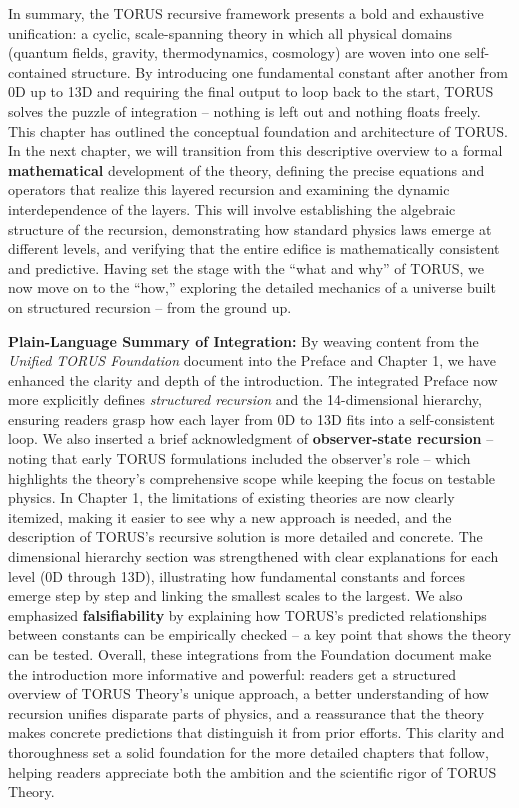 \documentclass[]{article}
\begin{document}
In summary, the TORUS recursive framework presents a bold and exhaustive
unification: a cyclic, scale-spanning theory in which all physical
domains (quantum fields, gravity, thermodynamics, cosmology) are woven
into one self-contained structure. By introducing one fundamental
constant after another from 0D up to 13D and requiring the final output
to loop back to the start, TORUS solves the puzzle of integration --
nothing is left out and nothing floats freely. This chapter has outlined
the conceptual foundation and architecture of TORUS. In the next
chapter, we will transition from this descriptive overview to a formal
\textbf{mathematical} development of the theory, defining the precise
equations and operators that realize this layered recursion and
examining the dynamic interdependence of the layers. This will involve
establishing the algebraic structure of the recursion, demonstrating how
standard physics laws emerge at different levels, and verifying that the
entire edifice is mathematically consistent and predictive. Having set
the stage with the ``what and why'' of TORUS, we now move on to the
``how,'' exploring the detailed mechanics of a universe built on
structured recursion -- from the ground up.

\textbf{Plain-Language Summary of Integration:} By weaving content from
the \emph{Unified TORUS Foundation} document into the Preface and
Chapter 1, we have enhanced the clarity and depth of the introduction.
The integrated Preface now more explicitly defines \emph{structured
recursion} and the 14-dimensional hierarchy, ensuring readers grasp how
each layer from 0D to 13D fits into a self-consistent loop. We also
inserted a brief acknowledgment of \textbf{observer-state recursion} --
noting that early TORUS formulations included the observer's role --
which highlights the theory's comprehensive scope while keeping the
focus on testable physics. In Chapter 1, the limitations of existing
theories are now clearly itemized, making it easier to see why a new
approach is needed, and the description of TORUS's recursive solution is
more detailed and concrete. The dimensional hierarchy section was
strengthened with clear explanations for each level (0D through 13D),
illustrating how fundamental constants and forces emerge step by step
and linking the smallest scales to the largest. We also emphasized
\textbf{falsifiability} by explaining how TORUS's predicted
relationships between constants can be empirically checked -- a key
point that shows the theory can be tested. Overall, these integrations
from the Foundation document make the introduction more informative and
powerful: readers get a structured overview of TORUS Theory's unique
approach, a better understanding of how recursion unifies disparate
parts of physics, and a reassurance that the theory makes concrete
predictions that distinguish it from prior efforts. This clarity and
thoroughness set a solid foundation for the more detailed chapters that
follow, helping readers appreciate both the ambition and the scientific
rigor of TORUS Theory.
\end{document}
